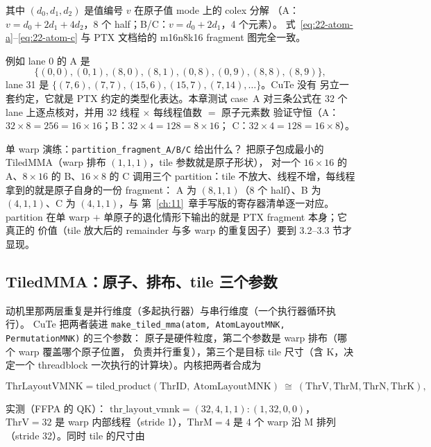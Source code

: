 其中 $(d_0,d_1,d_2)$ 是值编号 $v$ 在原子值 mode 上的 colex 分解
（A：$v=d_0+2d_1+4d_2$，8 个 half；B/C：$v=d_0+2d_1$，4 个元素）。
式~\eqref{eq:22-atom-a}--\eqref{eq:22-atom-c} 与 PTX 文档给的 m16n8k16
fragment 图完全一致。

例如 lane 0 的 A 是
\begin{equation*}
  \{(0,0),(0,1),(8,0),(8,1),(0,8),(0,9),(8,8),(8,9)\},
\end{equation*}
lane 31 是 $\{(7,6),(7,7),(15,6),(15,7),(7,14),\dots\}$。CuTe 没有
另立一套约定，它就是 PTX 约定的类型化表达。本章测试 case~A 对三条公式在
32 个 lane 上逐点核对，并用 32 线程 $\times$ 每线程值数 $=$ 原子元素数
验证守恒（A：$32\times8=256=16\times16$；B：$32\times4=128=8\times16$；
C：$32\times4=128=16\times8$）。

单 warp 演练：\texttt{partition\_\allowbreak{}fragment\_\allowbreak{}A/\allowbreak{}B/\allowbreak{}C} 给出什么？
把原子包成最小的 TiledMMA（warp 排布 $(1,1,1)$，tile 参数就是原子形状），
对一个 $16\times16$ 的 A、$8\times16$ 的 B、$16\times8$ 的 C 调用三个
partition：tile 不放大、线程不增，每线程拿到的就是原子自身的一份 fragment：
A 为 $(8,1,1)$（8 个 half）、B 为 $(4,1,1)$、C 为 $(4,1,1)$，与
第~\ref{ch:11}~章手写版的寄存器清单逐一对应。partition
在单 warp $+$ 单原子的退化情形下输出的就是 PTX fragment 本身；它真正的
价值（tile 放大后的 remainder 与多 warp 的重复因子）要到 3.2--3.3 节才
显现。

\subsection{TiledMMA：原子、排布、tile 三个参数}

动机里那两层重复是并行维度（多起执行器）与串行维度（一个执行器循环执行）。
CuTe 把两者装进
\texttt{make\_\allowbreak{}tiled\_\allowbreak{}mma\allowbreak{}(atom,\allowbreak{} Atom\allowbreak{}Layout\allowbreak{}MNK,\allowbreak{} Permutation\allowbreak{}MNK)} 的三个参数：
原子是硬件粒度，第二个参数是 warp 排布（哪个 warp 覆盖哪个原子位置，
负责并行重复），第三个是目标 tile 尺寸（含 K，决定一个 threadblock
一次执行的计算块）。内核把两者合成为

\begin{equation}
  \mathrm{ThrLayoutVMNK} = \mathrm{tiled\_product}(\mathrm{ThrID},\
  \mathrm{AtomLayoutMNK}) \ \cong\ (\mathrm{ThrV},\mathrm{ThrM},
  \mathrm{ThrN},\mathrm{ThrK}) ,
  \label{eq:22-thr-vmnk}
\end{equation}

实测（FFPA 的 QK）：
$\mathrm{thr\_layout\_vmnk} = (32,4,1,1){:}(1,32,0,0)$，$\mathrm{ThrV}=32$
是 warp 内部线程（stride 1），$\mathrm{ThrM}=4$ 是 4 个 warp 沿 M 排列
（stride 32）。同时 tile 的尺寸由

